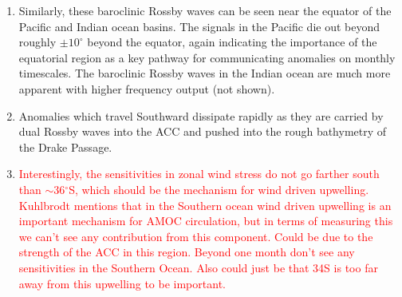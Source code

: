 \documentclass[a4paper,11pt]{article}
\newcommand{\red}[1]{\textcolor{red}{#1}}
\begin{document}
\begin{enumerate}
	\item Similarly, these baroclinic Rossby waves can be seen near the equator of the Pacific and Indian ocean basins. The signals in the Pacific die out beyond roughly $\pm10^{\circ}$ beyond the equator, again indicating the importance of the equatorial region as a key pathway for communicating anomalies on monthly timescales. The baroclinic Rossby waves in the Indian ocean are much more apparent with higher frequency output (not shown).
	\item Anomalies which travel Southward dissipate rapidly as they are carried by dual Rossby waves into the ACC and pushed into the rough bathymetry of the Drake Passage. 
	\item \red{Interestingly, the sensitivities in zonal wind stress do not go farther south than $\sim$36$^{\circ}$S, which should be the mechanism for wind driven upwelling. Kuhlbrodt mentions that in the Southern ocean wind driven upwelling is an important mechanism for AMOC circulation, but in terms of measuring this we can't see any contribution from this component. Could be due to the strength of the ACC in this region. Beyond one month don't see any sensitivities in the Southern Ocean. Also could just be that 34S is too far away from this upwelling to be important.}
    \end{enumerate}
\end{document}

